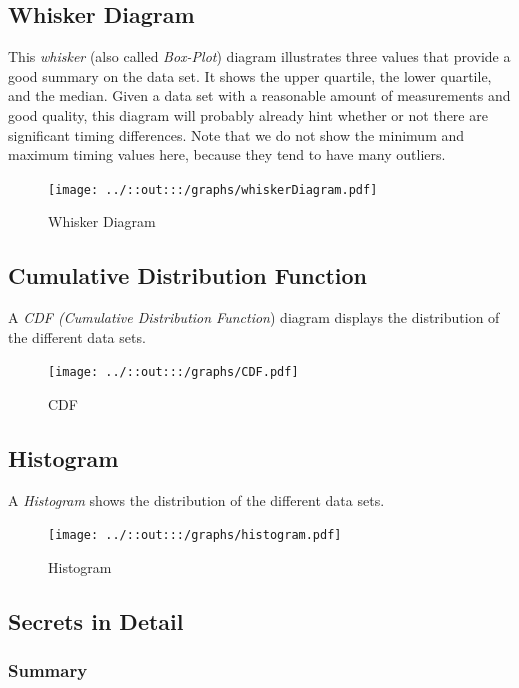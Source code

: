 \documentclass[
    oneside,        
    12pt
    ]{scrbook}
\begin{document}
\subsection{Whisker Diagram}\label{subsection2}
This \emph{whisker} (also called \emph{Box-Plot}) diagram illustrates three values that provide a good summary on the data set. It shows the upper quartile, the lower quartile, and the median. Given a data set with a reasonable amount of measurements and good quality, this diagram will probably already hint whether or not there are significant timing differences. Note that we do not show the minimum and maximum timing values here, because they tend to have many outliers.
	\begin{figure}[ht]
	\texttt{[image: ../::out:::/graphs/whiskerDiagram.pdf]}
	\caption[Results unfiltered: Whisker Diagram.]{Whisker Diagram}
  \label{fig:whiskerDiagram}
	\end{figure}
	\newpage

\subsection{Cumulative Distribution Function}\label{subsection3}
A \emph{CDF (Cumulative Distribution Function}) diagram displays the distribution of the different data sets.
	\begin{figure}[ht]
	\texttt{[image: ../::out:::/graphs/CDF.pdf]}
	\caption[Results unfiltered: CDF.]{CDF}
  \label{fig:cdf}
	\end{figure}
\newpage

\subsection{Histogram}\label{subsection4}
A \emph{Histogram} shows the distribution of the different data sets.
	\begin{figure}[ht]
	\texttt{[image: ../::out:::/graphs/histogram.pdf]}
	\caption[Results unfiltered: Histogram.]{Histogram}
  \label{fig:histogram}
	\end{figure}
\newpage

\subsection{Secrets in Detail}\label{subsection5}

\subsubsection{Summary}\label{subsubsection1}
\end{document}
